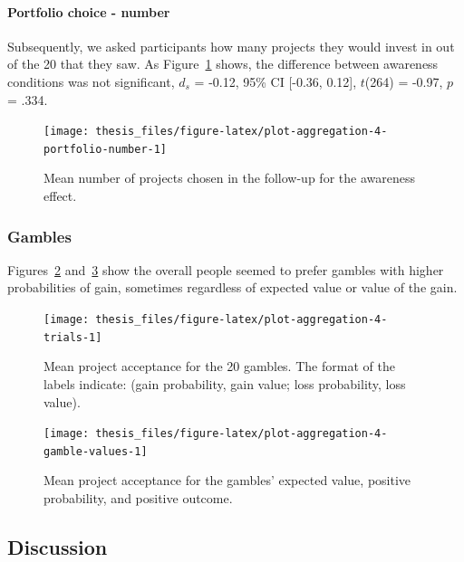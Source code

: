 \documentclass[a4paper, nobind, dvipsnames]{templates/ociamthesis}
\theoremstyle{definition}
\theoremstyle{definition}
\theoremstyle{definition}
\theoremstyle{definition}
\theoremstyle{remark}
\begin{document}
\hypertarget{portfolio-choice---number-2}{%
\paragraph{Portfolio choice - number}\label{portfolio-choice---number-2}}

Subsequently, we asked participants how many projects they would invest in out
of the 20 that they saw. As
Figure~\ref{fig:plot-aggregation-4-portfolio-number} shows, the difference
between awareness conditions was not significant,
\(d_s\) = -0.12, 95\% CI {[}-0.36, 0.12{]}, \(t\)(264) = -0.97, \(p\) = .334.



\begin{figure}
\texttt{[image: thesis\_files/figure-latex/plot-aggregation-4-portfolio-number-1]} \caption{Mean number of projects chosen in the follow-up for the awareness effect.}\label{fig:plot-aggregation-4-portfolio-number}
\end{figure}

\hypertarget{gambles-2}{%
\subsubsection{Gambles}\label{gambles-2}}

Figures~\ref{fig:plot-aggregation-4-trials}
and~\ref{fig:plot-aggregation-4-gamble-values} show the
overall people seemed to prefer gambles with higher probabilities of gain,
sometimes regardless of expected value or value of the gain.



\begin{figure}
\texttt{[image: thesis\_files/figure-latex/plot-aggregation-4-trials-1]} \caption{Mean project acceptance for the 20 gambles. The format of the labels indicate: (gain probability, gain value; loss probability, loss value).}\label{fig:plot-aggregation-4-trials}
\end{figure}



\begin{figure}
\texttt{[image: thesis\_files/figure-latex/plot-aggregation-4-gamble-values-1]} \caption{Mean project acceptance for the gambles' expected value, positive probability, and positive outcome.}\label{fig:plot-aggregation-4-gamble-values}
\end{figure}

\hypertarget{discussion-7}{%
\subsection{Discussion}\label{discussion-7}}
\end{document}
